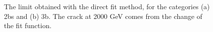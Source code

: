 \begin{figure}[htbp!]
\begin{center}
\caption{The limit obtained with the direct fit method, for the categories (a) 2bs and (b) 3b. The crack at 2000 GeV comes from the change of the fit function.}
\label{fig:directfit:limits}
\end{center}
\end{figure}
